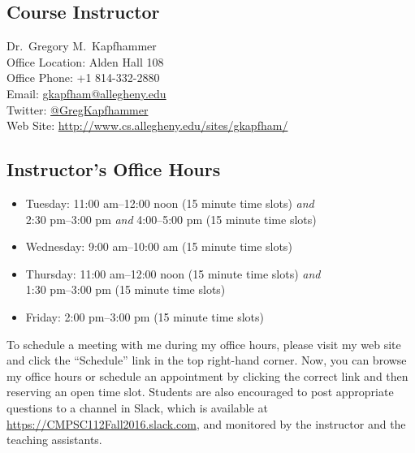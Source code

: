 

\usepackage[compact]{titlesec}



\subsection*{Course Instructor}
Dr.\ Gregory M.\ Kapfhammer\\
\noindent Office Location: Alden Hall 108 \\
\noindent Office Phone: +1 814-332-2880 \\
\noindent Email: \url{gkapfham@allegheny.edu} \\
\noindent Twitter: \url{@GregKapfhammer} \\
\noindent Web Site: \url{http://www.cs.allegheny.edu/sites/gkapfham/}

\subsection*{Instructor's Office Hours}

\begin{itemize}

  \itemsep.5em

  \item Tuesday: 11:00 am--12:00 noon (15 minute time slots) {\em and\/} \\ \hspace*{.6in}
    2:30 pm--3:00 pm {\em and\/} 4:00--5:00 pm (15 minute time slots)

  \item Wednesday: 9:00 am--10:00 am (15 minute time slots)

  \item Thursday: 11:00 am--12:00 noon (15 minute time slots) {\em and\/} \\ \hspace*{.68in}
    1:30 pm--3:00 pm (15 minute time slots)

  \item Friday: 2:00 pm--3:00 pm (15 minute time slots)

\end{itemize}

\noindent To schedule a meeting with me during my office hours, please visit my web site and click the ``Schedule'' link
in the top right-hand corner. Now, you can browse my office hours or schedule an appointment by clicking the correct
link and then reserving an open time slot. Students are also encouraged to post appropriate questions to a channel in
Slack, which is available at \url{https://CMPSC112Fall2016.slack.com}, and monitored by the instructor and the teaching
assistants.

